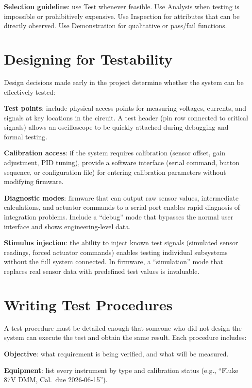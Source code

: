 \textbf{Selection guideline}: use Test whenever feasible. Use Analysis when testing is impossible or prohibitively expensive. Use Inspection for attributes that can be directly observed. Use Demonstration for qualitative or pass/fail functions.

\section{Designing for Testability}
Design decisions made early in the project determine whether the system can be effectively tested:

\textbf{Test points}: include physical access points for measuring voltages, currents, and signals at key locations in the circuit. A test header (pin row connected to critical signals) allows an oscilloscope to be quickly attached during debugging and formal testing.

\textbf{Calibration access}: if the system requires calibration (sensor offset, gain adjustment, PID tuning), provide a software interface (serial command, button sequence, or configuration file) for entering calibration parameters without modifying firmware.

\textbf{Diagnostic modes}: firmware that can output raw sensor values, intermediate calculations, and actuator commands to a serial port enables rapid diagnosis of integration problems. Include a ``debug'' mode that bypasses the normal user interface and shows engineering-level data.

\textbf{Stimulus injection}: the ability to inject known test signals (simulated sensor readings, forced actuator commands) enables testing individual subsystems without the full system connected. In firmware, a ``simulation'' mode that replaces real sensor data with predefined test values is invaluable.

\section{Writing Test Procedures}
A test procedure must be detailed enough that someone who did not design the system can execute the test and obtain the same result. Each procedure includes:

\textbf{Objective}: what requirement is being verified, and what will be measured.

\textbf{Equipment}: list every instrument by type and calibration status (e.g., ``Fluke 87V DMM, Cal.\ due 2026-06-15'').

